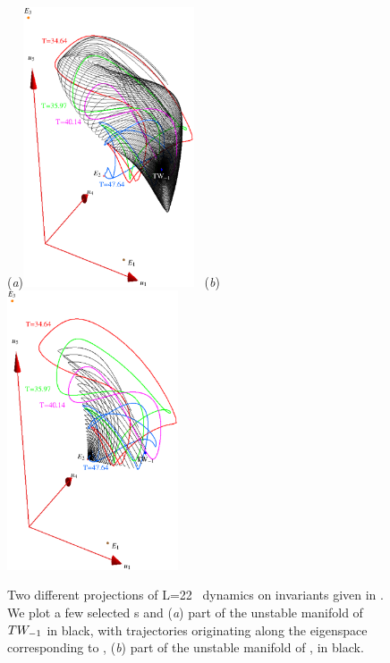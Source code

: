 \begin{figure}[t]
\begin{center}
  (\textit{a})\includegraphics[width=0.45\textwidth, clip=true]{../figs/ks22tw1umInv}
~(\textit{b})\includegraphics[width=0.45\textwidth, clip= true]{../figs/ks22-2wUMInv}
\end{center}
\caption[\KS\  reduced \statesp\ projection, $\REQV{-}{1}$ and $\EQV{1}$ unstable manifolds]
{Two different projections of L=22 \KS\ dynamics on invariants
given in . We plot a few selected {\rpo s} and  (\textit{a}) part of
the unstable manifold of
$\REQV{-}{1}$ in black, with trajectories originating along the eigenspace
corresponding to \eigExp[1],  (\textit{b}) part of the unstable manifold of , in black.}
\label{fig:TW1-E2red}
\end{figure}
